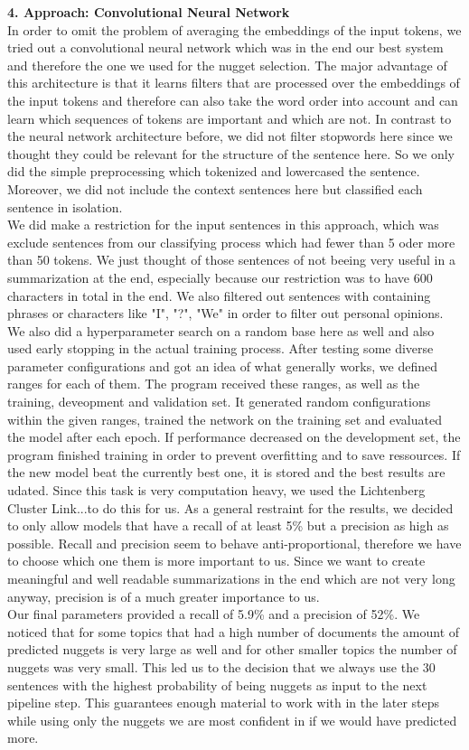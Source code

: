 \textbf{4. Approach: Convolutional Neural Network}\\
In order to omit the problem of averaging the embeddings of the input tokens, we tried out a convolutional neural network which was in the end our best system and therefore the one we used for the nugget selection. The major advantage of this architecture is that it learns filters that are processed over the embeddings of the input tokens and therefore can also take the word order into account and can learn which sequences of tokens are important and which are not. In contrast to the neural network architecture before, we did not filter stopwords here since we thought they could be relevant for the structure of the sentence here. So we only did the simple preprocessing which tokenized and lowercased the sentence. Moreover, we did not include the context sentences here but classified each sentence in isolation. \\
We did make a restriction for the input sentences in this approach, which was exclude sentences from our classifying process which had fewer than 5 oder more than 50 tokens. We just thought of those sentences of not beeing very useful in a summarization at the end, especially because our restriction was to have 600 characters in total in the end. We also filtered out sentences with containing phrases or characters like "I", "?", "We" in order to filter out personal opinions.\\
We also did a hyperparameter search on a random base here as well and also used early stopping in the actual training process. After testing some diverse parameter configurations and got an idea of what generally works, we defined ranges for each of them. The program received these ranges, as well as the training, deveopment and validation set. It generated random configurations within the given ranges, trained the network on the training set and evaluated the model after each epoch. If performance decreased on the development set, the program finished training in order to prevent overfitting and to save ressources. If the new model beat the currently best one, it is stored and the best results are udated. Since this task is very computation heavy, we used the Lichtenberg Cluster \lbrack Link...\rbrack to do this for us. As a general restraint for the results, we decided to only allow models that have a recall of at least 5\% but a precision as high as possible. Recall and precision seem to behave anti-proportional, therefore we have to choose which one them is more important to us. Since we want to create meaningful and well readable summarizations in the end which are not very long anyway, precision is of a much greater importance to us. \\
Our final parameters provided a recall of 5.9\% and a precision of 52\%. We noticed that for some topics that had a high number of documents the amount of predicted nuggets is very large as well and for other smaller topics the number of nuggets was very small. This led us to the decision that we always use the 30 sentences with the highest probability of being nuggets as input to the next pipeline step. This guarantees enough material to work with in the later steps while using only the nuggets we are most confident in if we would have predicted more.\\
